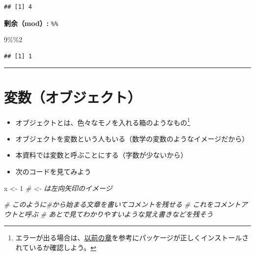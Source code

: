 \documentclass[
]{book}
\newenvironment{Shaded}{\begin{snugshade}}{\end{snugshade}}
\newcommand{\CommentTok}[1]{\textcolor[rgb]{0.56,0.35,0.01}{\textit{#1}}}
\newcommand{\DecValTok}[1]{\textcolor[rgb]{0.00,0.00,0.81}{#1}}
\newcommand{\NormalTok}[1]{#1}
\newcommand{\OtherTok}[1]{\textcolor[rgb]{0.56,0.35,0.01}{#1}}
\newcommand{\SpecialCharTok}[1]{\textcolor[rgb]{0.00,0.00,0.00}{#1}}
\begin{document}
\begin{verbatim}
## [1] 4
\end{verbatim}

\textbf{剰余（mod）:} \texttt{\%\%}

\begin{Shaded}
\begin{Highlighting}[]
\DecValTok{9}\SpecialCharTok{\%\%}\DecValTok{2}
\end{Highlighting}
\end{Shaded}

\begin{verbatim}
## [1] 1
\end{verbatim}

\begin{center}\rule{0.5\linewidth}{0.5pt}\end{center}

\hypertarget{ux5909ux6570ux30aaux30d6ux30b8ux30a7ux30afux30c8}{%
\section{変数（オブジェクト）}\label{ux5909ux6570ux30aaux30d6ux30b8ux30a7ux30afux30c8}}

\begin{itemize}
\item
  オブジェクトとは、色々なモノを入れる箱のようなもの\footnote{エラーが出る場合は、\protect\hyperlink{ux30d1ux30c3ux30b1ux30fcux30b8ux306eux30a4ux30f3ux30b9ux30c8ux30fcux30eb}{以前の章}を参考にパッケージが正しくインストールされているか確認しよう。}\\
\item
  オブジェクトを変数という人もいる（数学の変数のようなイメージだから）
\item
  本資料では変数と呼ぶことにする（字数が少ないから）
\item
  次のコードを見てみよう
\end{itemize}

\begin{Shaded}
\begin{Highlighting}[]
\NormalTok{x }\OtherTok{\textless{}{-}} \DecValTok{1} \CommentTok{\# \textless{}{-} は左向矢印のイメージ}

\CommentTok{\# このように\#から始まる文章を書いてコメントを残せる}
\CommentTok{\# これをコメントアウトと呼ぶ}
\CommentTok{\# あとで見てわかりやすいような覚え書きなどを残そう}
\end{Highlighting}
\end{Shaded}
\end{document}
